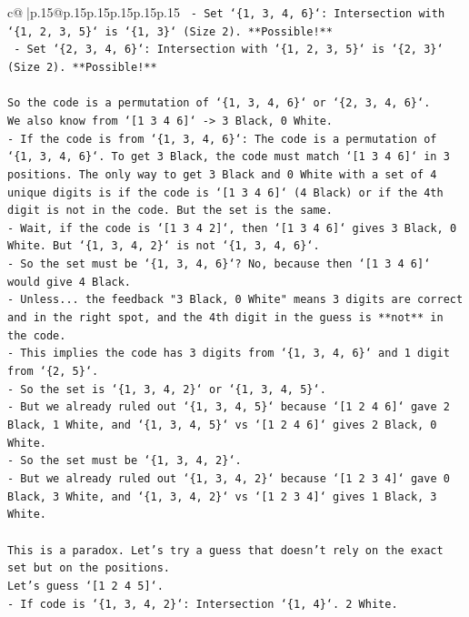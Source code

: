 \documentclass{article}
\begin{document}
{\begin{supertabular}{c@{$\;$}|p{.15\linewidth}@{}p{.15\linewidth}p{.15\linewidth}p{.15\linewidth}p{.15\linewidth}p{.15\linewidth}}
{{{\texttt{        {-}   Set `\{1, 3, 4, 6\}`: Intersection with `\{1, 2, 3, 5\}` is `\{1, 3\}` (Size 2). **Possible!**} \\
\texttt{        {-}   Set `\{2, 3, 4, 6\}`: Intersection with `\{1, 2, 3, 5\}` is `\{2, 3\}` (Size 2). **Possible!**} \\
\\ 
\texttt{So the code is a permutation of `\{1, 3, 4, 6\}` or `\{2, 3, 4, 6\}`.} \\
\texttt{We also know from `{[}1 3 4 6{]}` {-}> 3 Black, 0 White.} \\
\texttt{{-}   If the code is from `\{1, 3, 4, 6\}`: The code is a permutation of `\{1, 3, 4, 6\}`. To get 3 Black, the code must match `{[}1 3 4 6{]}` in 3 positions. The only way to get 3 Black and 0 White with a set of 4 unique digits is if the code is `{[}1 3 4 6{]}` (4 Black) or if the 4th digit is not in the code. But the set is the same.} \\
\texttt{{-}   Wait, if the code is `{[}1 3 4 2{]}`, then `{[}1 3 4 6{]}` gives 3 Black, 0 White. But `\{1, 3, 4, 2\}` is not `\{1, 3, 4, 6\}`.} \\
\texttt{{-}   So the set must be `\{1, 3, 4, 6\}`? No, because then `{[}1 3 4 6{]}` would give 4 Black.} \\
\texttt{{-}   Unless... the feedback "3 Black, 0 White" means 3 digits are correct and in the right spot, and the 4th digit in the guess is **not** in the code.} \\
\texttt{{-}   This implies the code has 3 digits from `\{1, 3, 4, 6\}` and 1 digit from `\{2, 5\}`.} \\
\texttt{{-}   So the set is `\{1, 3, 4, 2\}` or `\{1, 3, 4, 5\}`.} \\
\texttt{{-}   But we already ruled out `\{1, 3, 4, 5\}` because `{[}1 2 4 6{]}` gave 2 Black, 1 White, and `\{1, 3, 4, 5\}` vs `{[}1 2 4 6{]}` gives 2 Black, 0 White.} \\
\texttt{{-}   So the set must be `\{1, 3, 4, 2\}`.} \\
\texttt{{-}   But we already ruled out `\{1, 3, 4, 2\}` because `{[}1 2 3 4{]}` gave 0 Black, 3 White, and `\{1, 3, 4, 2\}` vs `{[}1 2 3 4{]}` gives 1 Black, 3 White.} \\
\\ 
\texttt{This is a paradox. Let's try a guess that doesn't rely on the exact set but on the positions.} \\
\texttt{Let's guess `{[}1 2 4 5{]}`.} \\
\texttt{{-}   If code is `\{1, 3, 4, 2\}`: Intersection `\{1, 4\}`. 2 White.} \\
}}}
\end{supertabular}}
\end{document}
